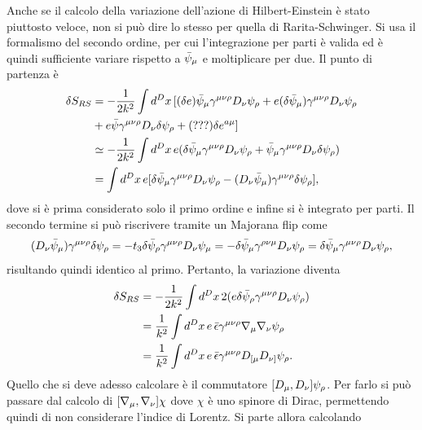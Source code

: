 Anche se il calcolo della variazione dell'azione di Hilbert-Einstein è stato piuttosto veloce, non si può dire lo stesso per quella di Rarita-Schwinger. Si usa il formalismo del secondo ordine, per cui l'integrazione per parti è valida ed è quindi sufficiente variare rispetto a $\bar{\psi}_\mu$ e moltiplicare per due. Il punto di partenza è 
\begin{equation}
    \begin{split}
        \delta S_{RS} &= -\frac{1}{2k^2}\int d^Dx\,[(\delta e)\bar{\psi}_\mu \gamma^{\mu\nu\rho}D_\nu\psi_\rho + e(\delta\bar{\psi}_\mu)\gamma^{\mu\nu\rho}D_\nu\psi_\rho \\
        &+ e\bar{\psi}\gamma^{\mu\nu\rho}D_\nu\delta\psi_\rho + (???)\delta e^{a\mu}] \\
        &\simeq -\frac{1}{2k^2}\int d^Dx\,e(\delta\bar{\psi}_\mu\gamma^{\mu\nu\rho}D_\nu\psi_\rho + \bar{\psi}_\mu\gamma^{\mu\nu\rho}D_\nu\delta\psi_\rho) \\
        &= \int d^Dx\,e[\delta\bar{\psi}_\mu\gamma^{\mu\nu\rho}D_\nu\psi_\rho - (D_\nu\bar{\psi}_\mu)\gamma^{\mu\nu\rho}\delta\psi_\rho],
    \end{split}
\end{equation}
dove si è prima considerato solo il primo ordine e infine si è integrato per parti. Il secondo termine si può riscrivere tramite un Majorana flip come 
\begin{equation}
    \begin{split}
        (D_\nu\bar{\psi}_\mu)\gamma^{\mu\nu\rho}\delta\psi_\rho = -t_3\delta\bar{\psi}_\rho\gamma^{\mu\nu\rho}D_\nu\psi_\mu = -\delta\bar{\psi}_\mu\gamma^{\rho\nu\mu}D_\nu\psi_\rho = \delta\bar{\psi}_\mu\gamma^{\mu\nu\rho}D_\nu\psi_\rho,
    \end{split}
\end{equation}
risultando quindi identico al primo. Pertanto, la variazione diventa 
\begin{equation}
    \begin{split}
        \delta S_{RS} &= -\frac{1}{2k^2}\int d^Dx\,2(e\delta\bar{\psi}_\rho\gamma^{\mu\nu\rho}D_\nu\psi_\rho) \\
        &= \frac{1}{k^2}\int d^Dx\,e\,\bar{\epsilon}\gamma^{\mu\nu\rho}\nabla_\mu\nabla_\nu\psi_\rho \\
        &= \frac{1}{k^2}\int d^Dx\,e\,\bar{\epsilon}\gamma^{\mu\nu\rho}D_{[\mu}D_{\nu]}\psi_\rho.
    \end{split}
\end{equation}
Quello che si deve adesso calcolare è il commutatore $[D_\mu,D_\nu]\psi_\rho$. Per farlo si può passare dal calcolo di $[\nabla_\mu,\nabla_\nu]\chi$ dove $\chi$ è uno spinore di Dirac, permettendo quindi di non considerare l'indice di Lorentz. Si parte allora calcolando 
